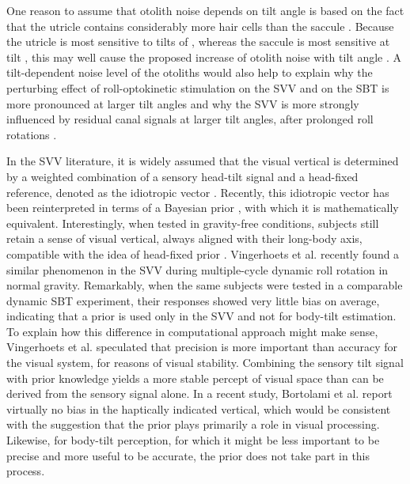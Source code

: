 One reason to assume that otolith noise depends on tilt angle is based on the fact that the utricle contains considerably more hair cells than the saccule \cite{rosenhall1972, rosenhall1974}. Because the utricle is most sensitive to tilts of \textdegree, whereas the saccule is most sensitive at  tilt \cite{jaeger2008}, this may well cause the proposed increase of otolith noise with tilt angle \cite{tarnutzer2010}. A tilt-dependent noise level of the otoliths would also help to explain why the perturbing effect of roll-optokinetic stimulation on the SVV \cite{dichgans1974, fernandez1976} and on the SBT \cite{young1975} is more pronounced at larger tilt angles and why the SVV is more strongly influenced by residual canal signals at larger tilt angles, after prolonged roll rotations \cite{lorincz2008}.

In the SVV literature, it is widely assumed that the visual vertical is determined by a weighted combination of a sensory head-tilt signal and a head-fixed reference, denoted as the idiotropic vector \cite{mittelstaedt1983}. Recently, this idiotropic vector has been reinterpreted in terms of a Bayesian prior \cite{eggert1998, macneilage2007, devrijer2008}, with which it is mathematically equivalent. Interestingly, when tested in gravity-free conditions, subjects still retain a sense of visual vertical, always aligned with their long-body axis, compatible with the idea of head-fixed prior \cite{mittelstaedt1983}. Vingerhoets et al. \citeyear{vingerhoets2008} recently found a similar phenomenon in the SVV during multiple-cycle dynamic roll rotation in normal gravity. Remarkably, when the same subjects were tested in a comparable dynamic SBT experiment, their responses showed very little bias on average, indicating that a prior is used only in the SVV and not for body-tilt estimation. To explain how this difference in computational approach might make sense, Vingerhoets et al. \citeyear{vingerhoets2008} speculated that precision is more important than accuracy for the visual system, for reasons of visual stability. Combining the sensory tilt signal with prior knowledge yields a more stable percept of visual space than can be derived from the sensory signal alone. In a recent study, Bortolami et al. \citeyear{bortolami2006} report virtually no bias in the haptically indicated vertical, which would be consistent with the suggestion that the prior plays primarily a role in visual processing. Likewise, for body-tilt perception, for which it might be less important to be precise and more useful to be accurate, the prior does not take part in this process. 

